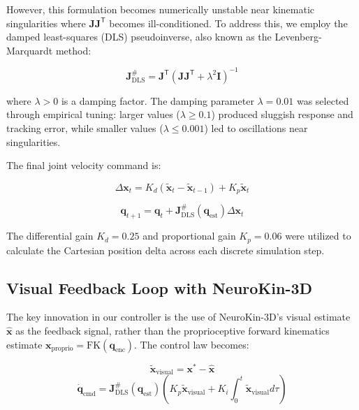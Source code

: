 \documentclass[12pt,a4paper,oneside]{report}
\begin{document}
However, this formulation becomes numerically unstable near kinematic singularities where $\mathbf{J} \mathbf{J}^{\mathsf{T}}$ becomes ill-conditioned. To address this, we employ the damped least-squares (DLS) pseudoinverse, also known as the Levenberg-Marquardt method:

\begin{equation}
\mathbf{J}^{\#}_{\text{DLS}} = \mathbf{J}^{\mathsf{T}} (\mathbf{J} \mathbf{J}^{\mathsf{T}} + \lambda^2 \mathbf{I})^{-1}
\end{equation}

where $\lambda > 0$ is a damping factor. The damping parameter $\lambda = 0.01$ was selected through empirical tuning: larger values ($\lambda \geq 0.1$) produced sluggish response and tracking error, while smaller values ($\lambda \leq 0.001$) led to oscillations near singularities.

The final joint velocity command is:

\begin{equation}
\Delta \mathbf{x}_t = K_d (\tilde{\mathbf{x}}_t - \tilde{\mathbf{x}}_{t-1}) + K_p \tilde{\mathbf{x}}_t
\end{equation}

\begin{equation}
\mathbf{q}_{t+1} = \mathbf{q}_t + \mathbf{J}^{\#}_{\text{DLS}}(\mathbf{q}_{\text{est}}) \Delta \mathbf{x}_t
\end{equation}

The differential gain $K_d = 0.25$ and proportional gain $K_p = 0.06$ were utilized to calculate the Cartesian position delta across each discrete simulation step.

\subsection{Visual Feedback Loop with NeuroKin-3D}

The key innovation in our controller is the use of NeuroKin-3D's visual estimate $\hat{\mathbf{x}}$ as the feedback signal, rather than the proprioceptive forward kinematics estimate $\mathbf{x}_{\text{proprio}} = \text{FK}(\mathbf{q}_{\text{enc}})$. The control law becomes:

\begin{equation}
\tilde{\mathbf{x}}_{\text{visual}} = \mathbf{x}^* - \hat{\mathbf{x}}
\end{equation}
\begin{equation}
\dot{\mathbf{q}}_{\text{cmd}} = \mathbf{J}^{\#}_{\text{DLS}}(\mathbf{q}_{\text{est}}) \left( K_p \tilde{\mathbf{x}}_{\text{visual}} + K_i \int_0^t \tilde{\mathbf{x}}_{\text{visual}} d\tau \right)
\end{equation}
\end{document}
